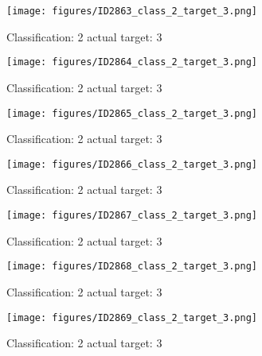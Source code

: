\begin{figure}[h!]
\begin{center}
\texttt{[image: figures/ID2863\_class\_2\_target\_3.png]}
\end{center}
\caption{ Classification: 2 actual target: 3}
\label{fig:ID2863_class_2_target_3}
\end{figure}
\begin{figure}[h!]
\begin{center}
\texttt{[image: figures/ID2864\_class\_2\_target\_3.png]}
\end{center}
\caption{ Classification: 2 actual target: 3}
\label{fig:ID2864_class_2_target_3}
\end{figure}
\begin{figure}[h!]
\begin{center}
\texttt{[image: figures/ID2865\_class\_2\_target\_3.png]}
\end{center}
\caption{ Classification: 2 actual target: 3}
\label{fig:ID2865_class_2_target_3}
\end{figure}
\begin{figure}[h!]
\begin{center}
\texttt{[image: figures/ID2866\_class\_2\_target\_3.png]}
\end{center}
\caption{ Classification: 2 actual target: 3}
\label{fig:ID2866_class_2_target_3}
\end{figure}
\begin{figure}[h!]
\begin{center}
\texttt{[image: figures/ID2867\_class\_2\_target\_3.png]}
\end{center}
\caption{ Classification: 2 actual target: 3}
\label{fig:ID2867_class_2_target_3}
\end{figure}
\begin{figure}[h!]
\begin{center}
\texttt{[image: figures/ID2868\_class\_2\_target\_3.png]}
\end{center}
\caption{ Classification: 2 actual target: 3}
\label{fig:ID2868_class_2_target_3}
\end{figure}
\begin{figure}[h!]
\begin{center}
\texttt{[image: figures/ID2869\_class\_2\_target\_3.png]}
\end{center}
\caption{ Classification: 2 actual target: 3}
\label{fig:ID2869_class_2_target_3}
\end{figure}
